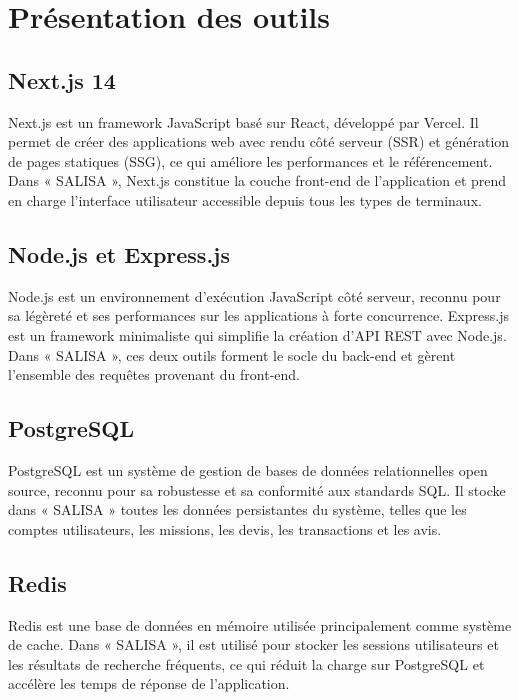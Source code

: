 \section{Présentation des outils}

\subsection*{\textcolor{vertCongo}{Next.js 14}}

Next.js est un framework JavaScript basé sur React, développé par Vercel. Il permet de créer des applications web avec rendu côté serveur (SSR) et génération de pages statiques (SSG), ce qui améliore les performances et le référencement. Dans « SALISA », Next.js constitue la couche front-end de l'application et prend en charge l'interface utilisateur accessible depuis tous les types de terminaux.

\subsection*{\textcolor{vertCongo}{Node.js et Express.js}}

Node.js est un environnement d'exécution JavaScript côté serveur, reconnu pour sa légèreté et ses performances sur les applications à forte concurrence. Express.js est un framework minimaliste qui simplifie la création d'API REST avec Node.js. Dans « SALISA », ces deux outils forment le socle du back-end et gèrent l'ensemble des requêtes provenant du front-end.

\subsection*{\textcolor{vertCongo}{PostgreSQL}}

PostgreSQL est un système de gestion de bases de données relationnelles open source, reconnu pour sa robustesse et sa conformité aux standards SQL. Il stocke dans « SALISA » toutes les données persistantes du système, telles que les comptes utilisateurs, les missions, les devis, les transactions et les avis.

\subsection*{\textcolor{vertCongo}{Redis}}

Redis est une base de données en mémoire utilisée principalement comme système de cache. Dans « SALISA », il est utilisé pour stocker les sessions utilisateurs et les résultats de recherche fréquents, ce qui réduit la charge sur PostgreSQL et accélère les temps de réponse de l'application.


